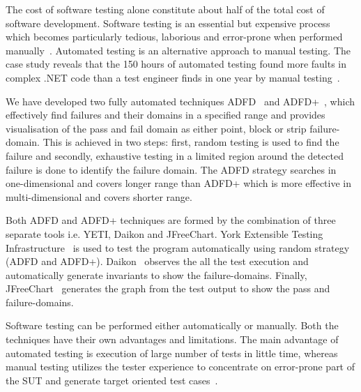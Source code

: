 \documentclass[conference]{IEEEtran}
\begin{document}

The cost of software testing alone constitute about half of the total cost of software development. Software testing is an essential but expensive process which becomes particularly tedious, laborious and error-prone when performed manually~\cite{Beizer1990}. Automated testing is an alternative approach to manual testing. The case study reveals that the 150 hours of automated testing found more faults in complex .NET code than a test engineer finds in one year by manual testing~\cite{pacheco2008finding}. 

We have developed two fully automated techniques ADFD~\cite{ahmad2013adfd} and ADFD+~\cite{ahmad2014adfd2}, which effectively find failures and their domains in a specified range and provides visualisation of the pass and fail domain as either point, block or strip failure-domain. This is achieved in two steps: first, random testing is used to find the failure and secondly, exhaustive testing in a limited region around the detected failure is done to identify the failure domain. The ADFD strategy searches in one-dimensional and covers longer range than ADFD+ which is more effective in multi-dimensional and covers shorter range.

Both ADFD and ADFD+ techniques are formed by the combination of three separate tools i.e. YETI, Daikon and JFreeChart. York Extensible Testing Infrastructure~\cite{Oriol2011yeti} is used to test the program automatically using random strategy (ADFD and ADFD+). Daikon~\cite{ernst2007daikon} observes the all the test execution and automatically generate invariants to show the failure-domains. Finally, JFreeChart~\cite{gilbert2008jfreechart} generates the graph from the test output to show the pass and failure-domains. 

Software testing can be performed either automatically or manually. Both the techniques have their own advantages and limitations. The main advantage of automated testing is execution of large number of tests in little time, whereas manual testing utilizes the tester experience to concentrate on error-prone part of the SUT and generate target oriented test cases~\cite{Leitner2007}. 
\end{document}
